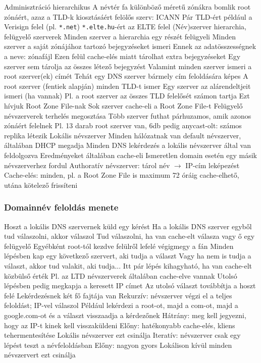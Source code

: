 \documentclass[12pt,a4paper]{article}
\begin{document}
\pagebreak

\begin{outline}
	\1 Adminisztráció hierarchikus
		\2 A névtér fa különböző méretű zónákra bomlik
		\2 root zónáért, azaz a TLD-k kiosztásáért felölős szerv: ICANN
		\2 Pár TLD-ért például a Verisign felel (pl. \texttt{*.net})
		\2 \texttt{*.elte.hu}-ért az ELTE felel
	\1 (Név)szerver hierarchia, felügyelő szerverek
		\2 Minden szerver a hierarchia egy részét felügyeli
		\2 Minden szerver a saját zónájához tartozó bejegyzéseket ismeri
			\3 Ennek az adatösszességnek a neve: zónafájl
			\3 Ezen felül cache-elés miatt tárolhat extra bejegyzéseket
			\3 Egy szerver sem tárolja az összes létező bejegyzést
		\2 Valamint minden szerver ismeri a root szerver(ek) címét
			\3 Tehát egy DNS szerver bármely cím feloldására képes
			\3 A root szerver (fentiek alapján) minden TLD-t ismer
		\2 Egy szerver az alárendeltjeit ismeri (ha vannak)
			\3 Pl. a root szerver az összes TLD felelősét számon tartja
				\4 Ezt hívjuk Root Zone File-nak
				\4 Sok szerver cache-eli a Root Zone File-t
	\1 Felügyelő névszerverek terhelés megosztása
		\2 Több szerver futhat párhuzamos, amik azonos zónáért felelnek
		\2 Pl. 13 darab root szerver van, 6db pedig anycast-olt: számos replika létezik
	\1 Lokális névszerver
		\2 Minden hálózatnak van default névszerver, általában DHCP megadja
		\2 Minden DNS lekérdezés a lokális névszerver által van feldolgozva
		\2 Eredményeket általában cache-eli
		\2 Ismeretlen domain esetén egy másik névszerverhez fordul
	\1 Authoratív névszerver: tárol név $\to$ IP-cím leképezést
	\1 Cache-elés: minden, pl. a Root Zone File is maximum 72 óráig cache-elhető, utána kötelező frissíteni
\end{outline}

\pagebreak

\subsubsection{Domainnév feloldás menete}

\begin{outline}
	\1 Hoszt a lokális DNS szervernek küld egy kérést
	\1 Ha a lokális DNS szerver egyből tud válaszolni, akkor válaszol
		\2 Tud válaszolni, ha van cache-elt válasza vagy ő egy felügyelő
	\1 Egyébként root-tól kezdve felülről lefelé végigmegy a fán
		\2 Minden lépésben kap egy következő szervert, aki tudja a választ
			\3 Vagy ha nem is tudja a választ, akkor tud valakit, aki tudja...
			\3 Itt pár lépés kihagyható, ha van cache-elt közbülső érték
				\4 Pl. az LTD névszerverek általában cache-elve vannak
		\2 Utolsó lépésben pedig megkapja a keresett IP címet
		\2 Az utolsó választ továbbítja a hoszt felé
	\1 Lekérdezésnek két fő fajtája van
		\2 Rekurzív: névszerver végzi el a teljes feloldást; IP-vel válaszol
			\3 Például lekérdezi a root-ot, majd a com-ot, majd a google.com-ot és a választ visszaadja a kérdezőnek
			\3 Hátrány: meg kell jegyezni, hogy az IP-t kinek kell visszaküldeni
			\3 Előny: hatékonyabb cache-elés, kliens tehermentesítése
			\3 Lokális névszerver ezt csinálja
		\2 Iteratív: névszerver csak egy lépést teszt a névfeloldásban
			\3 Előny: nagyon gyors
			\3 Lokálison kívül minden névszervert ezt csinálja
\end{outline}
\end{document}
